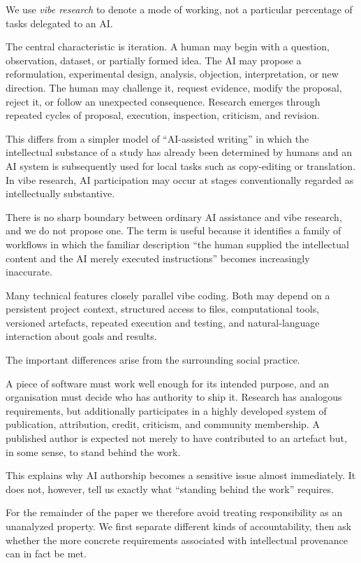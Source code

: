 We use \emph{vibe research} to denote a mode of working, not a particular percentage of tasks delegated to an AI.

The central characteristic is iteration. A human may begin with a question, observation, dataset, or partially formed idea. The AI may propose a reformulation, experimental design, analysis, objection, interpretation, or new direction. The human may challenge it, request evidence, modify the proposal, reject it, or follow an unexpected consequence. Research emerges through repeated cycles of proposal, execution, inspection, criticism, and revision.

This differs from a simpler model of ``AI-assisted writing'' in which the intellectual substance of a study has already been determined by humans and an AI system is subsequently used for local tasks such as copy-editing or translation. In vibe research, AI participation may occur at stages conventionally regarded as intellectually substantive.

There is no sharp boundary between ordinary AI assistance and vibe research, and we do not propose one. The term is useful because it identifies a family of workflows in which the familiar description ``the human supplied the intellectual content and the AI merely executed instructions'' becomes increasingly inaccurate.

Many technical features closely parallel vibe coding. Both may depend on a persistent project context, structured access to files, computational tools, versioned artefacts, repeated execution and testing, and natural-language interaction about goals and results.

The important differences arise from the surrounding social practice.

A piece of software must work well enough for its intended purpose, and an organisation must decide who has authority to ship it. Research has analogous requirements, but additionally participates in a highly developed system of publication, attribution, credit, criticism, and community membership. A published author is expected not merely to have contributed to an artefact but, in some sense, to stand behind the work.

This explains why AI authorship becomes a sensitive issue almost immediately. It does not, however, tell us exactly what ``standing behind the work'' requires.

For the remainder of the paper we therefore avoid treating responsibility as an unanalyzed property. We first separate different kinds of accountability, then ask whether the more concrete requirements associated with intellectual provenance can in fact be met.


